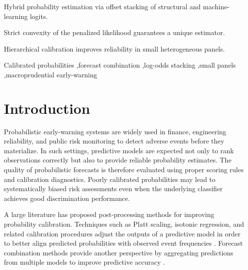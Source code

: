 \documentclass[a4paper,fleqn]{cas-dc}
\begin{document}
	\begin{highlights}
		\item Hybrid probability estimation via offset stacking of structural and machine-learning logits.
		\item Strict convexity of the penalized likelihood guarantees a unique estimator.
		\item Hierarchical calibration improves reliability in small heterogeneous panels.
	\end{highlights}
	
	\begin{keywords}
		Calibrated probabilities \sep forecast combination \sep log-odds stacking \sep small panels \sep macroprudential early-warning
	\end{keywords}
	
	\maketitle
	
	\section{Introduction}
	Probabilistic early-warning systems are widely used in finance, engineering
	reliability, and public risk monitoring to detect adverse events before they
	materialize. In such settings, predictive models are expected not only to rank
	observations correctly but also to provide reliable probability estimates. The
	quality of probabilistic forecasts is therefore evaluated using proper scoring
	rules and calibration diagnostics. Poorly calibrated probabilities may lead to
	systematically biased risk assessments even when the underlying classifier
	achieves good discrimination performance.
	
	A large literature has proposed post-processing methods for improving
	probability calibration. Techniques such as Platt scaling, isotonic
	regression, and related calibration procedures adjust the outputs of a
	predictive model in order to better align predicted probabilities with
	observed event frequencies
	\citep{Platt1999,ZadroznyElkan2002,NiculescuMizilCaruana2005,GuoEtAl2017,KullEtAl2017}.
	Forecast combination methods provide another perspective by aggregating
	predictions from multiple models to improve predictive accuracy
	\citep{BatesGranger1969,Clemen1989}.
	
\end{document}
